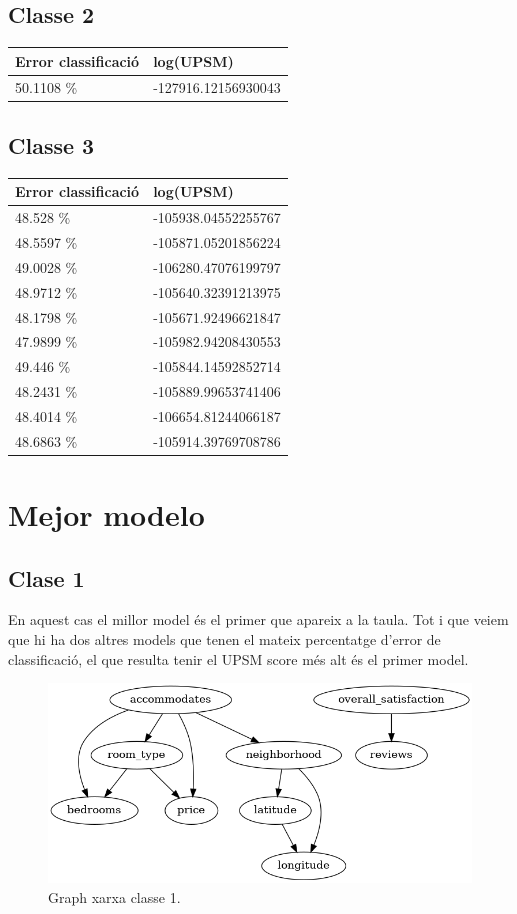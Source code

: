 \documentclass{article}
\begin{document}
\subsection{Classe 2}
\begin{table}[H]
\begin{tabular}{ll}
\hline
Error classificació & log(UPSM)           \\
\hline
50.1108 \%          & -127916.12156930043
\end{tabular}
\end{table}
\subsection{Classe 3}
\begin{table}[H]
\begin{tabular}{ll}
\hline
Error classificació & log(UPSM)           \\
\hline
48.528  \%          & -105938.04552255767 \\
48.5597 \%          & -105871.05201856224 \\
49.0028 \%          & -106280.47076199797 \\
48.9712 \%          & -105640.32391213975 \\
48.1798 \%          & -105671.92496621847 \\
47.9899 \%          & -105982.94208430553 \\
49.446  \%          & -105844.14592852714 \\
48.2431 \%          & -105889.99653741406 \\
48.4014 \%          & -106654.81244066187 \\
48.6863 \%          & -105914.39769708786
\end{tabular}
\end{table}
\section{Mejor modelo}
\subsection{Clase 1}
En aquest cas el millor model és el primer que apareix a la taula. Tot i que veiem que hi ha dos altres models que tenen el mateix percentatge d'error de classificació, el que resulta tenir el UPSM score més alt és el primer model.
\begin{figure}[H]
  \includegraphics[width=\linewidth]{classe1.png}
  \caption{Graph xarxa classe 1.}
  \label{fig:gp1}
\end{figure}
\end{document}
